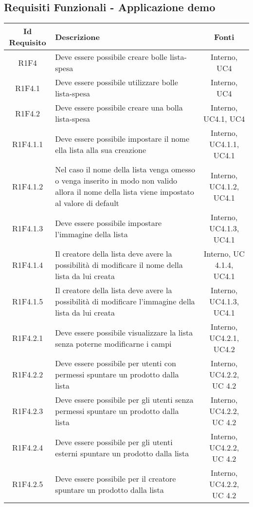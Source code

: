 \newpage
\subsection{Requisiti Funzionali - Applicazione demo}
\normalsize
\begingroup
\renewcommand\arraystretch{2}
\begin{longtable}{|c|>{\centering}m{7cm}|c|}
\hline
\textbf{Id Requisito} & \textbf{Descrizione} & \textbf{Fonti}\\
\hline
\endhead
			R1F4 & Deve essere possibile creare bolle lista-spesa  & Interno, UC4 \\
			\hline
			R1F4.1 & Deve essere possibile utilizzare bolle lista-spesa  & Interno, UC4 \\
			\hline
			R1F4.2 & Deve essere possibile creare una bolla lista-spesa & Interno, UC4.1, UC4 \\
			\hline
			R1F4.1.1 & Deve essere possibile impostare il nome ella lista alla sua creazione & Interno, UC4.1.1, UC4.1 \\
			\hline
			R1F4.1.2 & Nel caso il nome della lista venga omesso o venga inserito in modo non valido allora il nome della lista viene impostato al valore di default & Interno, UC4.1.2, UC4.1 \\
			\hline
			R1F4.1.3 & Deve essere possibile impostare l'immagine della lista & Interno, UC4.1.3, UC4.1 \\
			\hline
			R1F4.1.4 & Il creatore della lista deve avere la possibilità di modificare il nome della lista da lui creata & Interno, UC 4.1.4, UC4.1 \\
			\hline
			R1F4.1.5 & Il creatore della lista deve avere la possibilità di modificare l'immagine della lista da lui creata & Interno, UC4.1.3, UC4.1 \\
			\hline
			R1F4.2.1 & Deve essere possibile visualizzare la lista senza poterne modificarne i campi & Interno, UC4.2.1, UC4.2 \\
			\hline
			R1F4.2.2 & Deve essere possibile per utenti con permessi spuntare un prodotto dalla lista & Interno, UC4.2.2, UC 4.2 \\
			\hline
			R1F4.2.3 & Deve essere possibile per gli utenti senza permessi spuntare un prodotto dalla lista & Interno, UC4.2.2, UC 4.2 \\
			\hline
			R1F4.2.4 & Deve essere possibile per gli utenti esterni spuntare un prodotto dalla lista & Interno, UC4.2.2, UC 4.2 \\
			\hline
			R1F4.2.5 & Deve essere possibile per il creatore spuntare un prodotto dalla lista & Interno, UC4.2.2, UC 4.2 \\

\end{longtable}
